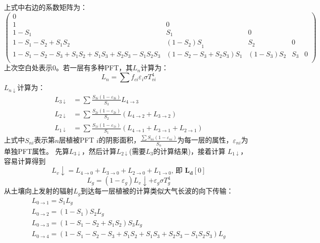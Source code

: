 上式中右边的系数矩阵为：
\begin{equation}
\left(\begin{matrix}0&&&&\\1&0&&&\\1-S_1&S_1&0&&\\1-S_1-S_2+S_1S_2&{\left(1-S_2\right)S}_1&S_2&0&\\
    1-S_1-S_2-S_3+S_1S_2+S_1S_3+S_2S_3-S_1S_2S_3&\left(1-S_2-S_3+S_2S_3\right)S_1&
    \left(1-S_3\right)S_2&S_3&0\\\end{matrix}\right)    
\end{equation}  
上次空白处表示0。若一层有多种PFT，其$L_n$计算为：
\begin{equation}
L_{n}=\sum f_{ci} \varepsilon_{i} \sigma T_{vi}^{4}
\end{equation}
$L_{n\downarrow}$计算为：
\begin{equation}
\begin{aligned} L_{3 \downarrow} &=\sum \frac{S_{3i}\left(1-\varepsilon_{3i}\right)}{S_{3}} L_{4 \rightarrow 3} \\ L_{2 \downarrow} &=\sum \frac{S_{2 i}\left(1-\varepsilon_{2 i}\right)}{S_{2}}\left(L_{4 \rightarrow 2}+L_{3 \rightarrow 2}\right) \\ L_{1 \downarrow} &=\sum \frac{S_{1 i}\left(1-\varepsilon_{1 i}\right)}{S_{1}}\left(L_{4 \rightarrow 1}+L_{3 \rightarrow 1}+L_{2 \rightarrow 1}\right) \end{aligned}
\end{equation}
上式中$S_{ni}$表示第$n$层植被PFT $i$的阴影面积，$\frac{\sum{S_{ni}\left(1-\varepsilon_{ni}\right)}}{S_n}$为每一层的属性，$\varepsilon_{ni}$为单独PFT属性。
先算$L_{3\downarrow}$，然后计算$L_{2\downarrow}$(需要$L_3$的计算结果)，接着计算 $L_{1\downarrow}$，容易计算得到
\begin{equation}
L_{v} \downarrow=L_{4 \rightarrow 0}+L_{3 \rightarrow 0}+L_{2 \rightarrow 0}+L_{1 \rightarrow 0} \text {, 即 } \boldsymbol{L}_{\boldsymbol{d}}[0]
\end{equation}
\begin{equation}
L_{g}=\left(1-\varepsilon_{g}\right) L_{v} \downarrow+\varepsilon_{g} \sigma T_{g}^{4}
\end{equation}
从土壤向上发射的辐射$L_g$到达每一层植被的计算类似大气长波的向下传输：
\begin{equation}
\begin{array}{l}L_{0 \rightarrow 1}=S_{1} L_{g} \\ L_{0 \rightarrow 2}=\left(1-S_{1}\right) S_{2} L_{g}
     \\ L_{0 \rightarrow 3}=\left(1-S_{1}-S_{2}+S_{1} S_{2}\right) S_{3} L_{g} \\
      L_{0 \rightarrow 4}=\left(1-S_{1}-S_{2}-S_{3}+S_{1} S_{2}+S_{1} S_{3}+S_{2} S_{3}-S_{1} S_{2} S_{3}\right) L_{g}\end{array}
\end{equation}
